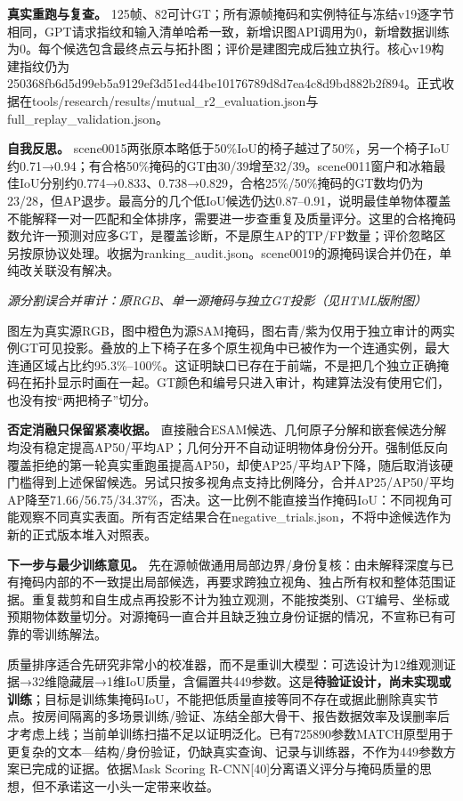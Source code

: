 \documentclass[UTF8,fontset=fandol]{ctexart}
\begin{document}
\textbf{真实重跑与复查。} 125帧、82可计GT；所有源帧掩码和实例特征与冻结v19逐字节相同，GPT请求指纹和输入清单哈希一致，新增识图API调用为0，新增数据训练为0。每个候选包含最终点云与拓扑图；评价是建图完成后独立执行。核心v19构建指纹仍为250368fb6d5d99eb5a9129ef3d51ed44be10176789d8d7ea4c8d9bd882b2f894。正式收据在tools/research/results/mutual\_r2\_evaluation.json与full\_replay\_validation.json。



\textbf{自我反思。} scene0015两张原本略低于50\%IoU的椅子越过了50\%，另一个椅子IoU约0.71→0.94；有合格50\%掩码的GT由30/39增至32/39。scene0011窗户和冰箱最佳IoU分别约0.774→0.833、0.738→0.829，合格25\%/50\%掩码的GT数均仍为23/28，但AP退步。最高分的几个低IoU候选仍达0.87–0.91，说明最佳单物体覆盖不能解释一对一匹配和全体排序，需要进一步查重复及质量评分。这里的合格掩码数允许一预测对应多GT，是覆盖诊断，不是原生AP的TP/FP数量；评价忽略区另按原协议处理。收据为ranking\_audit.json。scene0019的源掩码误合并仍在，单纯改关联没有解决。



\textit{源分割误合并审计：原RGB、单一源掩码与独立GT投影（见HTML版附图）}



图左为真实源RGB，图中橙色为源SAM掩码，图右青/紫为仅用于独立审计的两实例GT可见投影。叠放的上下椅子在多个原生视角中已被作为一个连通实例，最大连通区域占比约95.3\%–100\%。这证明缺口已存在于前端，不是把几个独立正确掩码在拓扑显示时画在一起。GT颜色和编号只进入审计，构建算法没有使用它们，也没有按“两把椅子”切分。



\textbf{否定消融只保留紧凑收据。} 直接融合ESAM候选、几何原子分解和嵌套候选分解均没有稳定提高AP50/平均AP；几何分开不自动证明物体身份分开。强制低反向覆盖拒绝的第一轮真实重跑虽提高AP50，却使AP25/平均AP下降，随后取消该硬门槛得到上述保留候选。另试只按多视角点支持比例降分，合并AP25/AP50/平均AP降至71.66/56.75/34.37\%，否决。这一比例不能直接当作掩码IoU：不同视角可能观察不同真实表面。所有否定结果合在negative\_trials.json，不将中途候选作为新的正式版本堆入对照表。



\textbf{下一步与最少训练意见。} 先在源帧做通用局部边界/身份复核：由未解释深度与已有掩码内部的不一致提出局部候选，再要求跨独立视角、独占所有权和整体范围证据。重复裁剪和自生成点再投影不计为独立观测，不能按类别、GT编号、坐标或预期物体数量切分。对源掩码一直合并且缺乏独立身份证据的情况，不宣称已有可靠的零训练解法。



质量排序适合先研究非常小的校准器，而不是重训大模型：可选设计为12维观测证据→32维隐藏层→1维IoU质量，含偏置共449参数。这是\textbf{待验证设计，尚未实现或训练}；目标是训练集掩码IoU，不能把低质量直接等同不存在或据此删除真实节点。按房间隔离的多场景训练/验证、冻结全部大骨干、报告数据效率及误删率后才考虑上线；当前单训练扫描不足以证明泛化。已有725890参数MATCH原型用于更复杂的文本—结构/身份验证，仍缺真实查询、记录与训练器，不作为449参数方案已完成的证据。依据Mask Scoring R-CNN[40]分离语义评分与掩码质量的思想，但不承诺这一小头一定带来收益。
\end{document}
